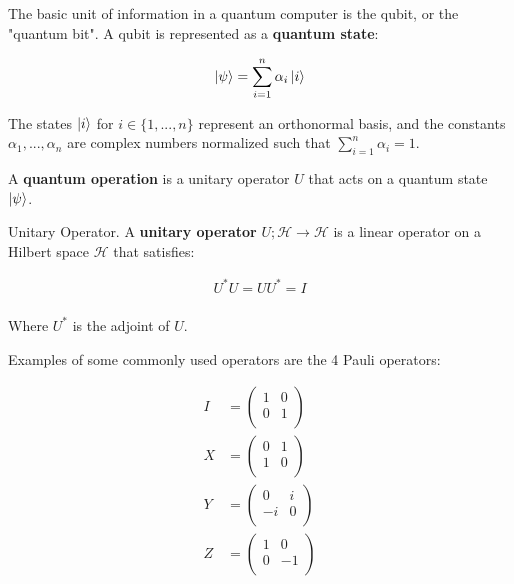 The basic unit of information in a quantum computer is the qubit, or the "quantum bit". A qubit is represented as a \textbf{quantum state}:

\begin{align*}
    \ket{\psi} &= \sum_{i=1}^n \alpha_i\ket{i} \\ 
\end{align*}

The states $\ket{i}$ for $i \in \{1,...,n\}$ represent an orthonormal basis, and the constants $\alpha_1,...,\alpha_n$ are complex numbers normalized such that $\sum_{i=1}^n \alpha_i = 1$.

A \textbf{quantum operation} is a unitary operator $U$ that acts on a quantum state $\ket{\psi}$.

\begin{definition}{Unitary Operator.}
    A \textbf{unitary operator} $U;\mathcal{H} \to \mathcal{H}$ is a linear operator on a Hilbert space $\mathcal{H}$ that satisfies:
    
    \begin{align*}
        U^*U = UU^* = I \\ 
    \end{align*}
    
    Where $U^*$ is the adjoint of $U$.
\end{definition}

Examples of some commonly used operators are the 4 Pauli operators:

\begin{align*}
    I &= \begin{pmatrix}
        1 & 0 \\ 
        0 & 1 \\ 
    \end{pmatrix} \\ 
    X &= \begin{pmatrix}
        0 & 1 \\ 
        1 & 0 \\ 
    \end{pmatrix} \\ 
    Y &= \begin{pmatrix}
        0 & i \\ 
        -i & 0 \\ 
    \end{pmatrix} \\ 
    Z &= \begin{pmatrix}
        1 & 0 \\ 
        0 & -1 \\ 
    \end{pmatrix} \\ 
\end{align*}

